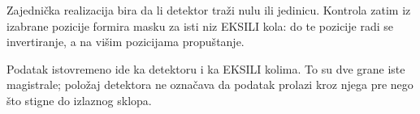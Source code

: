 Zajednička realizacija bira da li detektor traži nulu ili jedinicu. Kontrola zatim iz izabrane pozicije formira masku za isti niz EKSILI kola: do te pozicije radi se invertiranje, a na višim pozicijama propuštanje.

Podatak istovremeno ide ka detektoru i ka EKSILI kolima. To su dve grane iste magistrale; položaj detektora ne označava da podatak prolazi kroz njega pre nego što stigne do izlaznog sklopa.
